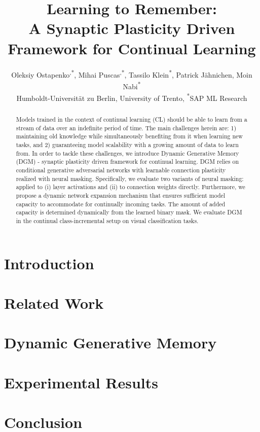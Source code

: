 \documentclass[10pt,twocolumn,letterpaper]{article}
\begin{document}
\title{Learning to Remember: \\ A Synaptic Plasticity Driven Framework for Continual Learning} 

\newcommand*{\affaddr}[1]{#1} \newcommand*{\affmark}[1][*]{\textsuperscript{#1}}
\newcommand*{\email}[2]{\texttt{#1}}

\author{Oleksiy Ostapenko\affmark[,*], Mihai Puscas\affmark[,*], Tassilo Klein\affmark[*], Patrick J\"ahnichen\affmark[], Moin Nabi\affmark[*]\\
\affaddr{\small \affmark[]Humboldt-Universit\"at zu Berlin},
\affaddr{\affmark[]University of Trento},
\affaddr{\affmark[*]SAP ML Research}
}



\maketitle

\begin{abstract}                  
  Models trained in the context of continual learning (CL) should be able to learn from a stream of data over an indefinite period of time. The main challenges herein are: 1) maintaining old knowledge while simultaneously benefiting from it when learning new tasks, and 2) guaranteeing model scalability with a growing amount of data to learn from. In order to tackle these challenges, we introduce Dynamic Generative Memory (DGM) - synaptic plasticity driven framework for continual learning. DGM relies on conditional generative adversarial networks with learnable connection plasticity realized with neural masking. Specifically, we evaluate two variants of neural masking: applied to (i) layer activations and (ii) to connection weights directly. Furthermore, we propose a dynamic network expansion mechanism that ensures sufficient model capacity to accommodate for continually incoming tasks. The amount of added capacity is determined dynamically from the learned binary mask. We evaluate DGM in the continual class-incremental setup on visual classification tasks. \end{abstract}




\section{Introduction}


\section{Related Work}
\label{sec:relWork}



\section{Dynamic Generative Memory}
\label{sec:method}

\section{Experimental Results}


\section{Conclusion}


{\small


}


\newpage
\end{document}
